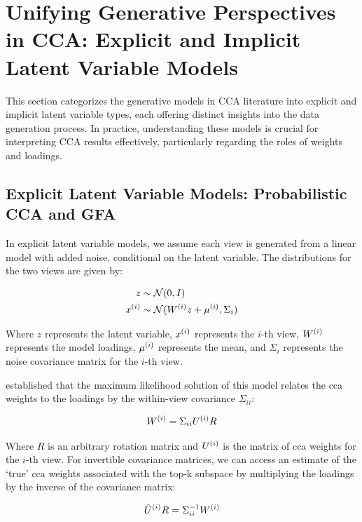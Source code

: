 \section{Unifying Generative Perspectives in CCA: Explicit and Implicit Latent Variable Models}

This section categorizes the generative models in CCA literature into explicit and implicit latent variable types, each offering distinct insights into the data generation process. In practice, understanding these models is crucial for interpreting CCA results effectively, particularly regarding the roles of weights and loadings.

\subsection{Explicit Latent Variable Models: Probabilistic CCA and GFA}

In explicit latent variable models, we assume each view is generated from a linear model with added noise, conditional on the latent variable. The distributions for the two views are given by:

\begin{align}
    z &\sim \mathcal{N}(0, I)\\
    x^{(i)} &\sim \mathcal{N}(W^{(i)} z + \mu^{(i)}, \Sigma_{i})
\end{align}

Where \(z\) represents the latent variable, \(x^{(i)}\) represents the \(i\)-th view, \(W^{(i)}\) represents the model loadings, \(\mu^{(i)}\) represents the mean, and \(\Sigma_{i}\) represents the noise covariance matrix for the \(i\)-th view.

\citet{bach2005probabilistic} established that the maximum likelihood solution of this model relates the \acrshort{cca} weights to the loadings by the within-view covariance \(\Sigma_{ii}\):

\begin{align}\label{eq:weights-to-loadings}
    W^{(i)} = \Sigma_{ii} U^{(i)} R
\end{align}

Where \(R\) is an arbitrary rotation matrix and \(U^{(i)}\) is the matrix of \acrshort{cca} weights for the \(i\)-th view. For invertible covariance matrices, we can access an estimate of the `true' \acrshort{cca} weights associated with the top-k subspace by multiplying the loadings by the inverse of the covariance matrix:

\begin{align}\label{eq:loadings-to-weights}
    \hat{U}^{(i)}R = \Sigma_{ii}^{-1} W^{(i)}
\end{align}

